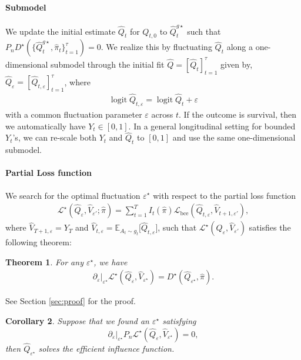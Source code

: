\documentclass{article}
\DeclareMathOperator{\logit}{logit}
\theoremstyle{plain}
\newtheorem{theorem}{Theorem}[section]
\newtheorem{corollary}[theorem]{Corollary}
\theoremstyle{definition}
\theoremstyle{remark}
\begin{document}
\paragraph{Submodel}
We update the initial estimate $\hat{Q}_t$ for $Q_{t,0}$ to $\hat{Q}^{g\star}_t$ such that $P_n D^\star(\{\hat{Q}^{g\star}_{t},\hat{\pi}_t\}_{t=1}^\tau)=0$. We realize this by fluctuating $\hat{Q}_t$ along a one-dimensional submodel through the initial fit $\hat{Q}=[\hat{Q}_t]_{t=1}^\tau$ given by, $\hat{Q}_\varepsilon=[\hat{Q}_{t,\varepsilon}]_{t=1}^\tau$, where
\begin{align}
    \logit \hat{Q}_{t,\varepsilon} = \logit \hat{Q}_t + \varepsilon
\end{align}
with a common fluctuation parameter $\varepsilon$ across $t$. If the outcome is survival, then we automatically have $Y_t\in[0,1]$. In a general longitudinal setting for bounded $Y_t$'s, we can re-scale both $Y_t$ and $\hat{Q}_t$ to $[0,1]$ and use the same one-dimensional submodel.

\paragraph{Partial Loss function}
We search for the optimal fluctuation $\varepsilon^\star$ with respect to the partial loss function 
\begin{align}
    \mathcal{L}^\star(\hat{Q}_\varepsilon, \hat{V}_{\varepsilon'};\hat{\pi})=\sum_{t=1}^T I_{t}(\hat{\pi})\mathcal{L}_{\mathrm{bce}}(\hat{Q}_{t,\varepsilon}, \hat{V}_{t+1,\varepsilon'}),
\end{align}
where $\hat{V}_{T+1,\varepsilon}=Y_T$ and $\hat{V}_{t,\varepsilon}= \mathbb E_{A_{t} \sim g_{t}} \big[\hat{Q}_{t,\varepsilon}\big]$, such that $\mathcal{L}^\star(\hat{Q}_\varepsilon, \hat{V}_{\varepsilon'})$ satisfies the following theorem:

\begin{theorem}
    \label{thm:plf}
    For any $\varepsilon^\star$, we have
    \begin{align}
        \partial_{\varepsilon}|_{\varepsilon^\star}\mathcal{L}^\star(\hat{Q}_\varepsilon, \hat{V}_{\varepsilon^\star}) = D^\star(\hat{Q}_{\varepsilon^\star}, \hat{\pi}).
    \end{align}
\end{theorem}

See Section \ref{sec:proof} for the proof.

\begin{corollary} 
Suppose that we found an $\varepsilon^\star$ satisfying 
\begin{equation}\label{criteria for epsilon star}
    \partial_{\varepsilon}|_{\varepsilon^\star}P_n\mathcal{L}^\star(\hat{Q}_\varepsilon, \hat{V}_{\varepsilon^\star})=0,
\end{equation} then $\hat{Q}_{\varepsilon^\star}$ solves the efficient influence function.
\end{corollary}
\end{document}
